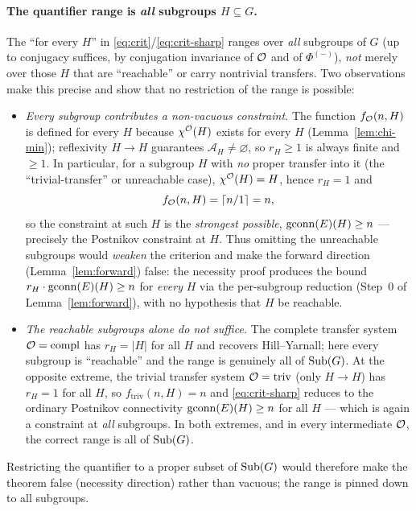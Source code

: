 \paragraph{The quantifier range is \emph{all} subgroups $H\subseteq G$.}
The ``for every $H$'' in \eqref{eq:crit}/\eqref{eq:crit-sharp} ranges over
\emph{all} subgroups of $G$ (up to conjugacy suffices, by conjugation invariance
of $\mathcal{O}$ and of $\Phi^{(-)}$), \emph{not} merely over those $H$ that are
``reachable'' or carry nontrivial transfers. Two observations make this precise
and show that no restriction of the range is possible:
\begin{itemize}\setlength\itemsep{3pt}
\item \emph{Every subgroup contributes a non-vacuous constraint.} The function
$f_{\mathcal{O}}(n,H)$ is defined for every $H$ because $\chi^{\mathcal{O}}(H)$ exists for
every $H$ (Lemma~\ref{lem:chi-min}); reflexivity $H\to H$ guarantees
$\mathcal A_H\ne\varnothing$, so $r_H\ge1$ is always finite and $\ge1$. In
particular, for a subgroup $H$ with \emph{no} proper transfer into it (the
``trivial-transfer'' or unreachable case), $\chi^{\mathcal{O}}(H)=H$, hence $r_H=1$ and
\[
f_{\mathcal{O}}(n,H)=\lceil n/1\rceil=n,
\]
so the constraint at such $H$ is the \emph{strongest possible},
$\operatorname{gconn}(E)(H)\ge n$ --- precisely the Postnikov constraint at $H$. Thus
omitting the unreachable subgroups would \emph{weaken} the criterion and make
the forward direction (Lemma~\ref{lem:forward}) false: the necessity proof
produces the bound $r_H\cdot\operatorname{gconn}(E)(H)\ge n$ for \emph{every} $H$ via the
per-subgroup reduction (Step~0 of Lemma~\ref{lem:forward}), with no hypothesis
that $H$ be reachable.
\item \emph{The reachable subgroups alone do not suffice.} The complete transfer
system $\mathcal{O}=\mathrm{compl}$ has $r_H=|H|$ for all $H$ and recovers
Hill--Yarnall; here every subgroup is ``reachable'' and the range is genuinely
all of $\operatorname{Sub}(G)$. At the opposite extreme, the trivial transfer system
$\mathcal{O}=\mathrm{triv}$ (only $H\to H$) has $r_H=1$ for all $H$, so
$f_{\mathrm{triv}}(n,H)=n$ and \eqref{eq:crit-sharp} reduces to the ordinary
Postnikov connectivity $\operatorname{gconn}(E)(H)\ge n$ for all $H$ --- which is again a
constraint at \emph{all} subgroups. In both extremes, and in every intermediate
$\mathcal{O}$, the correct range is all of $\operatorname{Sub}(G)$.
\end{itemize}
Restricting the quantifier to a proper subset of $\operatorname{Sub}(G)$ would therefore
make the theorem false (necessity direction) rather than vacuous; the range is
pinned down to all subgroups.

